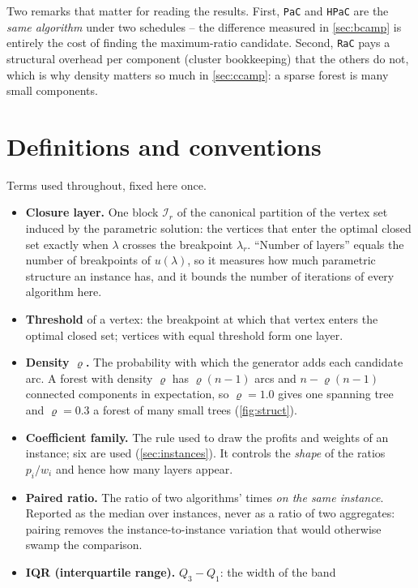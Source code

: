 \documentclass[11pt]{article}
\begin{document}
\noindent
Two remarks that matter for reading the results. First, \texttt{PaC} and
\texttt{HPaC} are the \emph{same algorithm} under two schedules -- the
difference measured in \cref{sec:bcamp} is entirely the cost of finding the
maximum-ratio candidate. Second, \texttt{RaC} pays a structural overhead per
component (cluster bookkeeping) that the others do not, which is why density
matters so much in \cref{sec:ccamp}: a sparse forest is many small components.

\section{Definitions and conventions}\label{sec:defs}

Terms used throughout, fixed here once.

\begin{itemize}
  \item \textbf{Closure layer.} One block $\mathcal I_r$ of the canonical
  partition of the vertex set induced by the parametric solution: the vertices
  that enter the optimal closed set exactly when $\lambda$ crosses the
  breakpoint $\lambda_r$. ``Number of layers'' equals the number of
  breakpoints of $u(\lambda)$, so it measures how much parametric structure an
  instance has, and it bounds the number of iterations of every algorithm here.
  \item \textbf{Threshold} of a vertex: the breakpoint at which that vertex
  enters the optimal closed set; vertices with equal threshold form one layer.
  \item \textbf{Density $\varrho$.} The probability with which the generator
  adds each candidate arc. A forest with density $\varrho$ has $\varrho(n-1)$
  arcs and $n-\varrho(n-1)$ connected components in expectation, so
  $\varrho=1.0$ gives one spanning tree and $\varrho=0.3$ a forest of many
  small trees (\cref{fig:struct}).
  \item \textbf{Coefficient family.} The rule used to draw the profits and
  weights of an instance; six are used (\cref{sec:instances}). It controls the
  \emph{shape} of the ratios $p_i/w_i$ and hence how many layers appear.
  \item \textbf{Paired ratio.} The ratio of two algorithms' times
  \emph{on the same instance}. Reported as the median over instances, never as
  a ratio of two aggregates: pairing removes the instance-to-instance variation
  that would otherwise swamp the comparison.
  \item \textbf{IQR (interquartile range).} $Q_3-Q_1$: the width of the band

\end{itemize}
\end{document}
